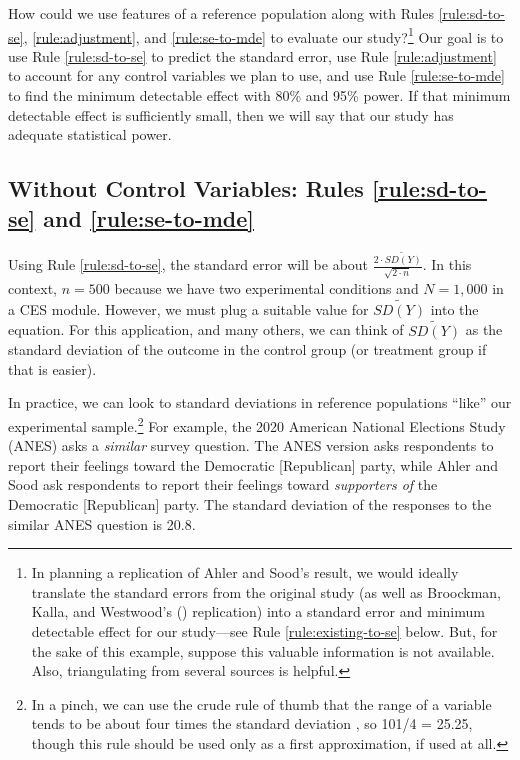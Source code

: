 \documentclass[12pt]{article}
\begin{document}
How could we use features of a reference population along with Rules \ref{rule:sd-to-se}, \ref{rule:adjustment}, and \ref{rule:se-to-mde} to evaluate our study?\footnote{
  In planning a replication of Ahler and Sood's result, we would ideally translate the standard errors from the original study (as well as Broockman, Kalla, and Westwood's (\citeyear{Broockman2022}) replication) into a standard error and minimum detectable effect for our study---see Rule \ref{rule:existing-to-se} below. 
  But, for the sake of this example, suppose this valuable information is not available.
  Also, triangulating from several sources is helpful.} 
Our goal is to use Rule \ref{rule:sd-to-se} to predict the standard error, use Rule \ref{rule:adjustment} to account for any control variables we plan to use, and use Rule \ref{rule:se-to-mde} to find the minimum detectable effect with 80\% and 95\% power. 
If that minimum detectable effect is sufficiently small, then we will say that our study has adequate statistical power.

\subsection*{Without Control Variables: Rules \ref{rule:sd-to-se} and \ref{rule:se-to-mde}}

Using Rule \ref{rule:sd-to-se}, the standard error will be about $\frac{2 \cdot \widetilde{SD(Y)}}{\sqrt{2 \cdot n}}$. 
In this context, $n = 500$ because we have two experimental conditions and $N = 1,000$ in a CES module. 
However, we must plug a suitable value for $\widetilde{SD(Y)}$ into the equation. For this application, and many others, we can think of $\widetilde{SD(Y)}$ as the standard deviation of the outcome in the control group (or treatment group if that is easier).

In practice, we can look to standard deviations in reference populations ``like'' our experimental sample.\footnote{In a pinch, we can use the crude rule of thumb that the range of a variable tends to be about four times the standard deviation \citep{Wan2014}, so 101/4 = 25.25, though this rule should be used only as a first approximation, if used at all.} 
For example, the 2020 American National Elections Study (ANES) asks a \emph{similar} survey question. 
The ANES version asks respondents to report their feelings toward the Democratic [Republican] party, while Ahler and Sood ask respondents to report their feelings toward \emph{supporters of} the Democratic [Republican] party. 
The standard deviation of the responses to the similar ANES question is 20.8.
\end{document}
